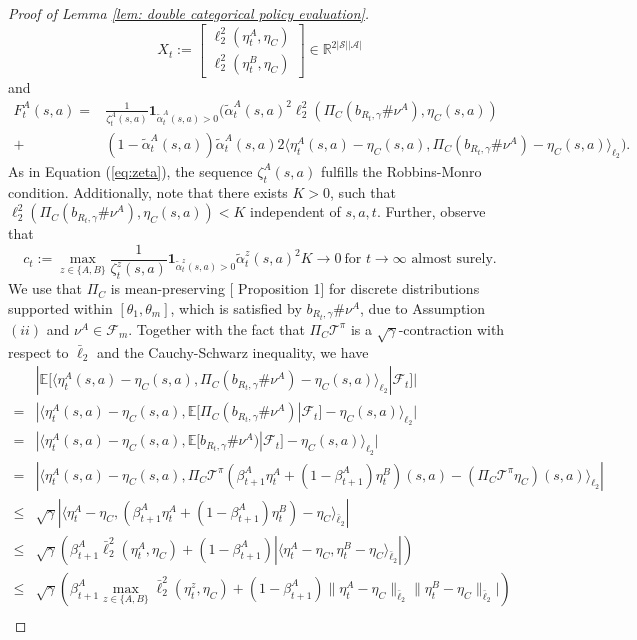 \documentclass{article}
\newcommand{\cA}{\mathcal{A}}
\newcommand{\cF}{\mathcal{F}}
\newcommand{\cS}{\mathcal{S}}
\newcommand{\cT}{\mathcal{T}}
\newcommand{\E}{\mathbb{E}}
\newcommand{\R}{\mathbb{R}}
\theoremstyle{plain}
\theoremstyle{definition}
\theoremstyle{remark}
\begin{document}
\begin{proof}[Proof of Lemma \ref{lem: double categorical policy evaluation}]
    \[X_t := \begin{bmatrix} \ell^2_2(\eta^A_{t},\eta_C) \\ \ell^2_2(\eta^B_{t},\eta_C) \end{bmatrix}\in \R^{2|\cS||\cA|}\]
    and
    \begin{align*}
    F^A_t(s,a)=&\frac{1}{\zeta_t^A(s,a)}\textbf{1}_{\tilde\alpha^A_t(s,a)>0}({\tilde\alpha^A_t}(s,a)^2\ell_2^2(\Pi_C(b_{R_t,\gamma}\#\nu^A),\eta_C(s,a))\\
    +&(1-\tilde\alpha^A_t(s,a))\tilde\alpha^A_t(s,a)2\langle\eta^A_{t}(s,a)-\eta_C(s,a),\Pi_C(b_{R_t,\gamma}\#\nu^A)-\eta_C(s,a)\rangle_{\ell_2}).
    \end{align*}
    As in Equation (\ref{eq:zeta}), the sequence $ \zeta_t^A(s,a)$ fulfills the Robbins-Monro condition. Additionally, note that there exists $K>0$, such that $\ell_2^2(\Pi_C(b_{R_t,\gamma}\#\nu^A),\eta_C(s,a))<K$ independent of $s,a,t$. Further, observe that
    \[c_t:=\max_{z\in\{A,B\}} \frac{1}{\zeta_t^z(s,a)}\textbf{1}_{\tilde\alpha^z_t(s,a)>0}{\tilde\alpha^z_t}(s,a)^2 K\to 0\ \text{for } t\to\infty\text{ almost surely}.\]
We use that $\Pi_C$ is mean-preserving [\cite{lyle19} Proposition 1] for discrete distributions supported within $[\theta_1,\theta_m]$, which is satisfied by $b_{R_t,\gamma}\#\nu^A$, due to Assumption $(ii)$ and $\nu^A\in\cF_m$. Together with the fact that $\Pi_C\cT^\pi$ is a $\sqrt{\gamma}$-contraction with respect to $\bar\ell_2$  and the Cauchy-Schwarz inequality, we have
\begin{align*}
    &|\E[\langle\eta^A_{t}(s,a)-\eta_C(s,a),\Pi_C(b_{R_t,\gamma}\#\nu^A)-\eta_C(s,a)\rangle_{\ell_2}|\cF_t]|\\
    =&|\langle\eta^A_{t}(s,a)-\eta_C(s,a),\E[\Pi_C(b_{R_t,\gamma}\#\nu^A)|\cF_t]-\eta_C(s,a)\rangle_{\ell_2}|\\
    =&|\langle\eta^A_{t}(s,a)-\eta_C(s,a),\E[b_{R_t,\gamma}\#\nu^A)|\cF_t]-\eta_C(s,a)\rangle_{\ell_2}|\\
    =&|\langle\eta^A_{t}(s,a)-\eta_C(s,a),\Pi_C\cT^\pi(\beta_{t+1}^A\eta^A_{t}+(1-\beta_{t+1}^A)\eta^B_{t})(s,a)-(\Pi_C\cT^\pi\eta_C)(s,a)\rangle_{\ell_2}|\\
    \leq&\sqrt{\gamma}|\langle\eta^A_{t}-\eta_C,(\beta_{t+1}^A\eta^A_{t}+(1-\beta_{t+1}^A)\eta^B_{t})-\eta_C\rangle_{\bar\ell_2}|\\
    \leq&\sqrt{\gamma}(\beta_{t+1}^A\bar\ell_2^2(\eta^A_{t},\eta_C)+(1-\beta_{t+1}^A)|\langle\eta^A_{t}-\eta_C,\eta^B_{t}-\eta_C\rangle_{\bar\ell_2}|)\\
    \leq&\sqrt{\gamma}(\beta_{t+1}^A\max_{z\in\{A,B\}}\bar\ell_2^2(\eta^z_{t},\eta_C)+(1-\beta_{t+1}^A)\|\eta^A_{t}-\eta_C\|_{\bar\ell_2}\|\eta^B_{t}-\eta_C\|_{\bar\ell_2}|)\\

\end{align*}
\end{proof}
\end{document}
